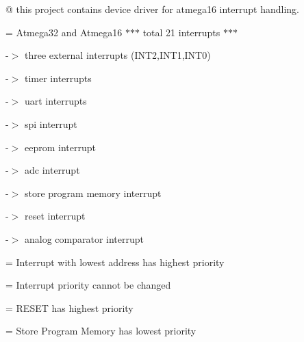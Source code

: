@ this project contains device driver for atmega16 interrupt handling.

= Atmega32 and Atmega16 $\ast$$\ast$$\ast$ total 21 interrupts $\ast$$\ast$$\ast$

-\/$>$ three external interrupts (INT2,INT1,INT0)

-\/$>$ timer interrupts

-\/$>$ uart interrupts

-\/$>$ spi interrupt

-\/$>$ eeprom interrupt

-\/$>$ adc interrupt

-\/$>$ store program memory interrupt

-\/$>$ reset interrupt

-\/$>$ analog comparator interrupt

= Interrupt with lowest address has highest priority

= Interrupt priority cannot be changed

= RESET has highest priority

= Store Program Memory has lowest priority 